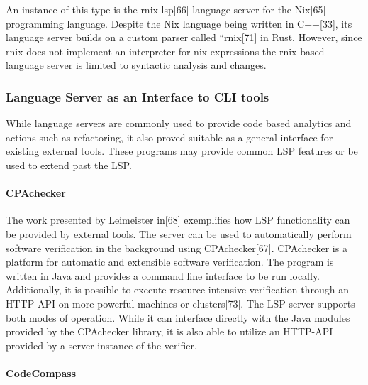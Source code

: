 \documentclass[
  a4paper,
  bibtex,
  english,
  nomenclature]{kthlatex/kththesis/kththesis}
\begin{document}
An instance of this type is the rnix-lsp{[}66{]} language server for the
Nix{[}65{]} programming language. Despite the Nix language being written
in C++{[}33{]}, its language server builds on a custom parser called
``rnix{[}71{]} in Rust. However, since rnix does not implement an
interpreter for nix expressions the rnix based language server is
limited to syntactic analysis and changes.

\hypertarget{sec:language-server-as-an-interface-to-cli-tools}{%
\subsubsection{Language Server as an Interface to CLI
tools}\label{sec:language-server-as-an-interface-to-cli-tools}}

While language servers are commonly used to provide code based analytics
and actions such as refactoring, it also proved suitable as a general
interface for existing external tools. These programs may provide common
LSP features or be used to extend past the LSP.

\hypertarget{sec:cpachecker}{%
\paragraph{CPAchecker}\label{sec:cpachecker}}

The work presented by Leimeister in{[}68{]} exemplifies how LSP
functionality can be provided by external tools. The server can be used
to automatically perform software verification in the background using
CPAchecker{[}67{]}. CPAchecker is a platform for automatic and
extensible software verification. The program is written in Java and
provides a command line interface to be run locally. Additionally, it is
possible to execute resource intensive verification through an HTTP-API
on more powerful machines or clusters{[}73{]}. The LSP server supports
both modes of operation. While it can interface directly with the Java
modules provided by the CPAchecker library, it is also able to utilize
an HTTP-API provided by a server instance of the verifier.

\hypertarget{sec:codecompass}{%
\paragraph{CodeCompass}\label{sec:codecompass}}
\end{document}

